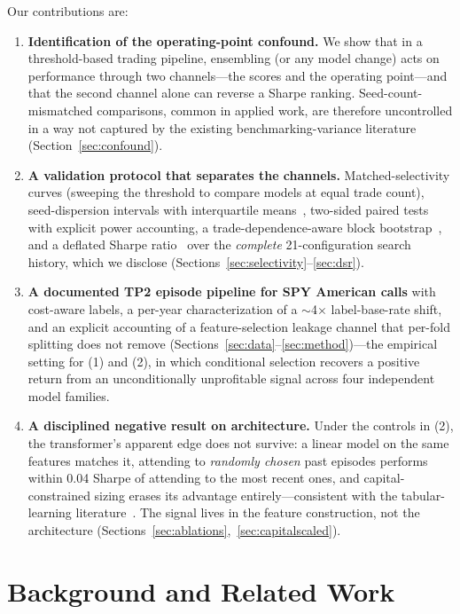 \documentclass[sigconf,review]{acmart}
\begin{document}
Our contributions are:
\begin{enumerate}
\item \textbf{Identification of the operating-point confound.} We show that in a threshold-based trading pipeline, ensembling (or any model change) acts on performance through two channels---the scores and the operating point---and that the second channel alone can reverse a Sharpe ranking. Seed-count-mismatched comparisons, common in applied work, are therefore uncontrolled in a way not captured by the existing benchmarking-variance literature (Section~\ref{sec:confound}).
\item \textbf{A validation protocol that separates the channels.} Matched-selectivity curves (sweeping the threshold to compare models at equal trade count), seed-dispersion intervals with interquartile means~\cite{agarwal2021deep}, two-sided paired tests with explicit power accounting, a trade-dependence-aware block bootstrap~\cite{kunsch1989}, and a deflated Sharpe ratio~\cite{bailey2014deflated} over the \emph{complete} 21-configuration search history, which we disclose (Sections~\ref{sec:selectivity}--\ref{sec:dsr}).
\item \textbf{A documented TP2 episode pipeline for SPY American calls} with cost-aware labels, a per-year characterization of a $\sim$4$\times$ label-base-rate shift, and an explicit accounting of a feature-selection leakage channel that per-fold splitting does not remove (Sections~\ref{sec:data}--\ref{sec:method})---the empirical setting for (1) and (2), in which conditional selection recovers a positive return from an unconditionally unprofitable signal across four independent model families.
\item \textbf{A disciplined negative result on architecture.} Under the controls in (2), the transformer's apparent edge does not survive: a linear model on the same features matches it, attending to \emph{randomly chosen} past episodes performs within 0.04 Sharpe of attending to the most recent ones, and capital-constrained sizing erases its advantage entirely---consistent with the tabular-learning literature~\cite{grinsztajn2022why,shwartzziv2022tabular,gorishniy2021revisiting}. The signal lives in the feature construction, not the architecture (Sections~\ref{sec:ablations},~\ref{sec:capitalscaled}).
\end{enumerate}

\section{Background and Related Work}
\label{sec:related}
\end{document}
